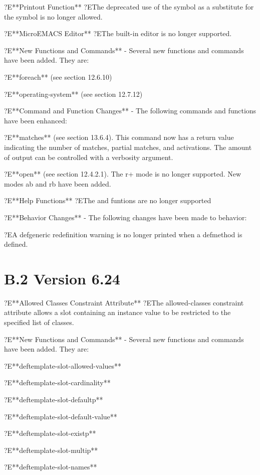 \documentclass[letterpaper,10pt,english]{sphinxmanual}
\begin{document}
?E**Printout Function** ?EThe deprecated use of the symbol  as a
substitute for the  symbol is no longer allowed.

?E**MicroEMACS Editor** ?EThe built-in editor is no longer supported.

?E**New Functions and Commands** - Several new functions and commands
have been added. They are:

?E**foreach** (see section 12.6.10)

?E**operating-system** (see section 12.7.12)

?E**Command and Function Changes** - The following commands and
functions have been enhanced:

?E**matches** (see section 13.6.4). This command now has a return value
indicating the number of matches, partial matches, and activations. The
amount of output can be controlled with a verbosity argument.

?E**open** (see section 12.4.2.1). The r+ mode is no longer supported.
New modes ab and rb have been added.

?E**Help Functions** ?EThe  and  funtions are no
longer supported

?E**Behavior Changes** - The following changes have been made to
behavior:

?EA defgeneric redefinition warning is no longer printed when a
defmethod is defined.


\section{B.2 Version 6.24}
\label{\detokenize{appendix:b-2-version-6-24}}
?E**Allowed Classes Constraint Attribute** ?EThe allowed-classes
constraint attribute allows a slot containing an instance value to be
restricted to the specified list of classes.

?E**New Functions and Commands** - Several new functions and commands
have been added. They are:

?E**deftemplate-slot-allowed-values**

?E**deftemplate-slot-cardinality**

?E**deftemplate-slot-defaultp**

?E**deftemplate-slot-default-value**

?E**deftemplate-slot-existp**

?E**deftemplate-slot-multip**

?E**deftemplate-slot-names**
\end{document}
